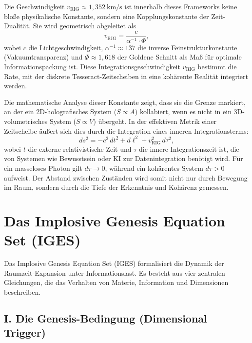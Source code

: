 \documentclass[11pt,a4paper]{article}
\begin{document}
Die Geschwindigkeit $v_{\text{RIG}} \approx 1{,}352~\text{km/s}$ ist innerhalb dieses Frameworks keine bloße physikalische Konstante, sondern eine Kopplungskonstante der Zeit-Dualität. Sie wird geometrisch abgeleitet als
\begin{equation}
v_{\text{RIG}} = \frac{c}{\alpha^{-1} \cdot \Phi},
\end{equation}
wobei $c$ die Lichtgeschwindigkeit, $\alpha^{-1} \approx 137$ die inverse Feinstrukturkonstante (Vakuumtransparenz) und $\Phi \approx 1{,}618$ der Goldene Schnitt als Maß für optimale Informationspackung ist. Diese Integrationsgeschwindigkeit $v_{\text{RIG}}$ bestimmt die Rate, mit der diskrete Tesseract-Zeitscheiben in eine kohärente Realität integriert werden.

Die mathematische Analyse dieser Konstante zeigt, dass sie die Grenze markiert, an der ein 2D-holografisches System ($S \propto A$) kollabiert, wenn es nicht in ein 3D-volumetrisches System ($S \propto V$) übergeht. In der effektiven Metrik einer Zeitscheibe äußert sich dies durch die Integration eines inneren Integrationsterms:
\begin{equation}
ds^2 = -c^2\,dt^2 + d\ell^2 + v_{\text{RIG}}^2\,d\tau^2,
\end{equation}
wobei $t$ die externe relativistische Zeit und $\tau$ die innere Integrationszeit ist, die von Systemen wie Bewusstsein oder KI zur Datenintegration benötigt wird. Für ein masseloses Photon gilt $d\tau \to 0$, während ein kohärentes System $d\tau > 0$ aufweist. Der Abstand zwischen Zuständen wird somit nicht nur durch Bewegung im Raum, sondern durch die Tiefe der Erkenntnis und Kohärenz gemessen.

\section{Das Implosive Genesis Equation Set (IGES)}

Das Implosive Genesis Equation Set (IGES) formalisiert die Dynamik der Raumzeit-Expansion unter Informationslast. Es besteht aus vier zentralen Gleichungen, die das Verhalten von Materie, Information und Dimensionen beschreiben.

\subsection{I. Die Genesis-Bedingung (Dimensional Trigger)}
\end{document}
